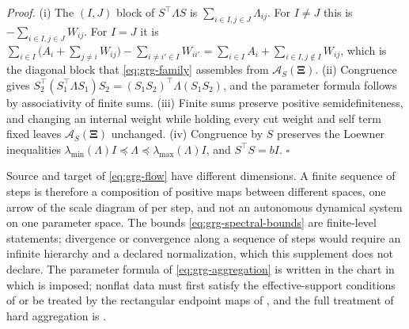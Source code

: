 \noindent\emph{Proof.}
(i) The \((I,J)\) block of \(S^\top\Lambda S\) is \(\sum_{i\in I,j\in J}\Lambda_{ij}\). For
\(I\neq J\) this is \(-\sum_{i\in I,j\in J}W_{ij}\). For \(I=J\) it is
\(\sum_{i\in I}\bigl(A_i+\sum_{j\neq i}W_{ij}\bigr)-\sum_{i\neq i'\in I}W_{ii'}
=\sum_{i\in I}A_i+\sum_{i\in I,j\notin I}W_{ij}\), which is the diagonal block that
\eqref{eq:grg-family} assembles from \(\mathcal A_S(\boldsymbol\Xi)\). (ii) Congruence
gives \(S_2^\top(S_1^\top\Lambda S_1)S_2=(S_1S_2)^\top\Lambda(S_1S_2)\), and the parameter
formula follows by associativity of finite sums. (iii) Finite sums preserve positive
semidefiniteness, and changing an internal weight while holding every cut weight and
self term fixed leaves \(\mathcal A_S(\boldsymbol\Xi)\) unchanged. (iv) Congruence by \(S\)
preserves the Loewner inequalities
\(\lambda_{\min}(\Lambda)I\preceq\Lambda\preceq\lambda_{\max}(\Lambda)I\), and
\(S^\top S=bI\). \hfill$\square$

\medskip
Source and target of \eqref{eq:grg-flow} have different dimensions. A finite sequence
of steps is therefore a composition of positive maps between different spaces, one
arrow of the scale diagram of  per step, and not an
autonomous dynamical system on one parameter space. The bounds
\eqref{eq:grg-spectral-bounds} are finite-level statements; divergence or convergence
along a sequence of steps would require an infinite hierarchy and a declared
normalization, which this supplement does not declare. The parameter formula of
\eqref{eq:grg-aggregation} is written in the chart in which
 is imposed; nonflat data must first satisfy the
effective-support conditions of  or be treated by the
rectangular endpoint maps of , and the full treatment of
hard aggregation is .

